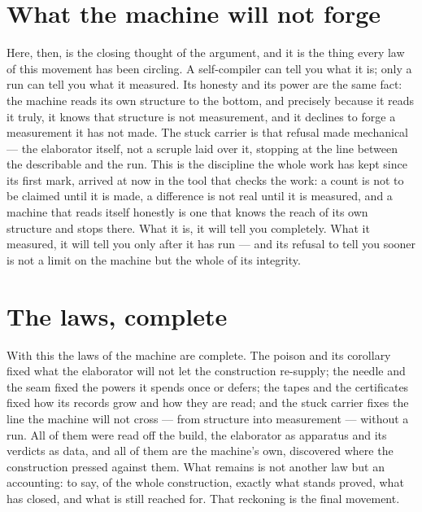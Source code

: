 \section{What the machine will not forge}
\label{se:what-the-machine-will-not-forge}

Here, then, is the closing thought of the argument, and it is the thing every law of this movement has been
circling. A self-compiler can tell you what it is; only a run can tell you what it measured. Its honesty and
its power are the same fact: the machine reads its own structure to the bottom, and precisely because it
reads it truly, it knows that structure is not measurement, and it declines to forge a measurement it has
not made. The stuck carrier is that refusal made mechanical --- the elaborator itself, not a scruple laid
over it, stopping at the line between the describable and the run. This is the discipline the whole work has
kept since its first mark, arrived at now in the tool that checks the work: a count is not to be claimed
until it is made, a difference is not real until it is measured, and a machine that reads itself honestly is
one that knows the reach of its own structure and stops there. What it is, it will tell you completely. What
it measured, it will tell you only after it has run --- and its refusal to tell you sooner is not a limit on
the machine but the whole of its integrity.

\section{The laws, complete}
\label{se:the-laws-complete}

With this the laws of the machine are complete. The poison and its corollary fixed what the elaborator will
not let the construction re-supply; the needle and the seam fixed the powers it spends once or defers; the
tapes and the certificates fixed how its records grow and how they are read; and the stuck carrier fixes the
line the machine will not cross --- from structure into measurement --- without a run. All of them were read
off the build, the elaborator as apparatus and its verdicts as data, and all of them are the machine's own,
discovered where the construction pressed against them. What remains is not another law but an accounting: to
say, of the whole construction, exactly what stands proved, what has closed, and what is still reached for.
That reckoning is the final movement.
